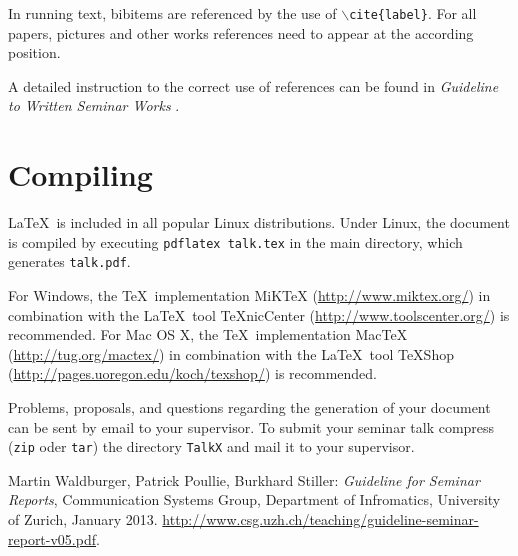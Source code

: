 In running text, bibitems are referenced by the use of \texttt{$\backslash$cite\{label\}}.
For all papers, pictures and other works references need to appear at the according position.

A detailed instruction to the correct use of references can be found in \emph{Guideline to Written Seminar Works} \cite{leitfaden}. 

\section{Compiling}

\LaTeX \ is included in all popular Linux distributions.
Under Linux, the document is compiled by executing \texttt{pdflatex talk.tex} in the main directory, 
which generates \texttt{talk.pdf}. 

For Windows, the \TeX \ implementation MiKTeX (\url{http://www.miktex.org/}) in combination with the \LaTeX \ tool TeXnicCenter (\url{http://www.toolscenter.org/}) is recommended. For Mac OS X, the \TeX \ implementation MacTeX (\url{http://tug.org/mactex/}) in combination with the \LaTeX \ tool TeXShop (\url{http://pages.uoregon.edu/koch/texshop/}) is recommended.

Problems, proposals, and questions regarding the generation of your document can be sent by email to your supervisor. To submit your seminar talk compress (\texttt{zip} oder \texttt{tar}) the directory \texttt{TalkX} and mail it to your supervisor.


\begin{thebibliography}{99}
 Martin Waldburger, Patrick Poullie, Burkhard Stiller: \emph{Guideline for Seminar Reports}, Communication Systems Group, Department of Infromatics, University of Zurich, January 2013. \url{http://www.csg.uzh.ch/teaching/guideline-seminar-report-v05.pdf}.
\end{thebibliography}

